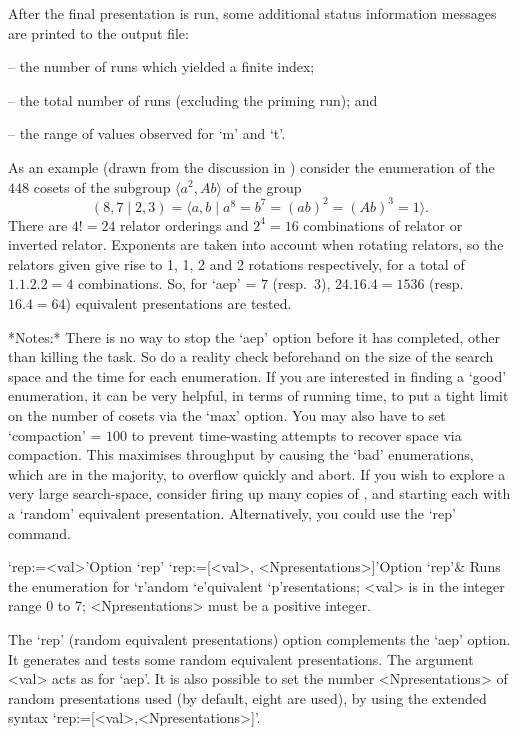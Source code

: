 After  the  final  presentation  is  run,   some   additional   status
information messages are printed to the {\ACE} output file:

\beginlist
\item{--}  the number of runs which yielded a finite index; 
\item{--}  the total number of runs (excluding the priming run); and 
\item{--}  the range of values observed for `m' and `t'.
\endlist

As an example (drawn from the discussion in \cite{HR99a}) consider the
enumeration of the  $448$  cosets  of  the  subgroup  $\langle  a^2,Ab
\rangle$ of the group
$$ (8,7 \mid 2,3) 
    = \langle a,b \mid a^8 = b^7 = (ab)^2 = (Ab)^3 = 1 \rangle. $$
There are $4!=24$  relator  orderings  and  $2^4=16$  combinations  of
relator or inverted relator. Exponents are  taken  into  account  when
rotating relators, so the relators given give rise to 1, 1,  2  and  2
rotations respectively, for a total of $1.1.2.2=4$  combinations.  So,
for  `aep'  =  $7$   (resp.~$3$),   $24.16.4=1536$   (resp.~$16.4=64$)
equivalent presentations are tested.

*Notes:*
There is no way to stop the `aep'  option  before  it  has  completed,
other than killing the task. So do a reality check beforehand  on  the
size of the search space and the time for each enumeration. If you are
interested in  finding  a  \lq{}good'  enumeration,  it  can  be  very
helpful, in terms of running time, to put a tight limit on the  number
of cosets via the `max' option. You may also have to set  `compaction'
=  $100$  to  prevent  time-wasting  attempts  to  recover  space  via
compaction.  This  maximises  throughput  by  causing  the   \lq{}bad'
enumerations, which are in  the  majority,  to  overflow  quickly  and
abort. If you wish to explore  a  very  large  search-space,  consider
firing up many copies of {\ACE}, and starting each with a \lq{}random'
equivalent  presentation.  Alternatively,  you  could  use  the  `rep'
command.

\beginitems

\>`rep:=<val>'{Option `rep'}
\>`rep:=[<val>, <Npresentations>]'{Option `rep'}&
Runs  the enumeration for `r'andom `e'quivalent `p'resentations;
<val> is in the integer range 0 to 7;
<Npresentations> must be a positive integer.

\enditems

The `rep' (random equivalent  presentations)  option  complements  the
`aep'  option.  It  generates  and  tests   some   random   equivalent
presentations. The argument <val>  acts  as  for  `aep'.  It  is  also
possible to set the number <Npresentations>  of  random  presentations
used (by default, eight  are  used),  by  using  the  extended  syntax
`rep:=[<val>,<Npresentations>]'.

